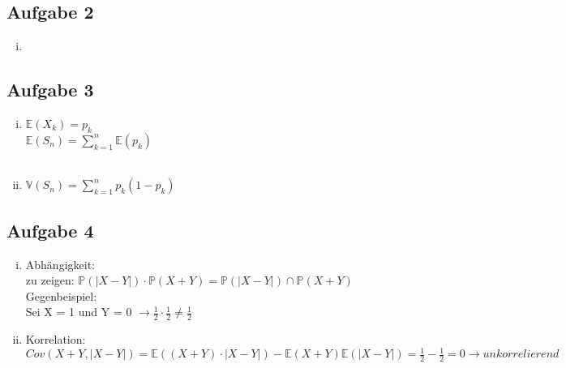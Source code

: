 \documentclass[10pt,a4paper,parskip=half]{scrartcl}
\begin{document}
\subsection*{Aufgabe 2}
\begin{enumerate}[(i)]
\item
\end{enumerate}

\subsection*{Aufgabe 3}
\begin{enumerate}[(i)]
\item
$\mathbb{E}(X_k) = p_k$ \\
$\mathbb{E}(S_n) = \sum\limits_{k=1}^n \mathbb{E}(p_k) $ \\ \\
\item
$\mathbb{V}(S_n) = \sum\limits_{k=1}^n p_k(1-p_k)$
\end{enumerate}

\subsection*{Aufgabe 4}
\begin{enumerate}[(i)]
\item
Abhängigkeit: \\
zu zeigen:
$\mathbb{P}(|X-Y|) \cdot \mathbb{P}(X+Y) = \mathbb{P}(|X-Y|) \cap \mathbb{P}(X+Y)$ \\
Gegenbeispiel: \\
Sei X = 1 und Y = 0
$\rightarrow \frac{1}{2} \cdot \frac{1}{2} \neq \frac{1}{2}$
\item
Korrelation: \\
$Cov(X+Y, |X-Y|) = \mathbb{E}((X+Y) \cdot |X-Y|) - \mathbb{E}(X+Y)\mathbb{E}(|X-Y|) = \frac{1}{2} - \frac{1}{2} = 0 \rightarrow unkorrelierend$ \\
\end{enumerate}
\end{document}
